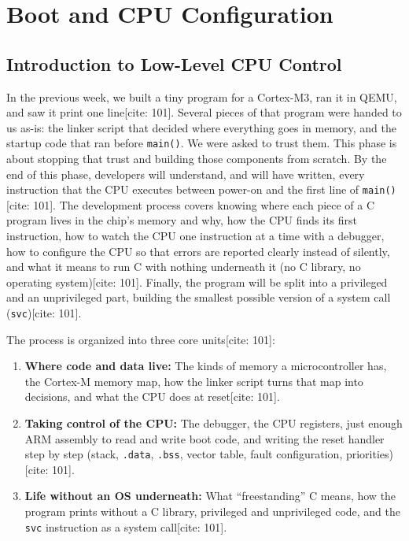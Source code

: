 \chapter{Boot and CPU Configuration}

\section{Introduction to Low-Level CPU Control}
In the previous week, we built a tiny program for a Cortex-M3, ran it in QEMU, and saw it print one line[cite: 101]. Several pieces of that program were handed to us as-is: the linker script that decided where everything goes in memory, and the startup code that ran before \texttt{main()}. We were asked to trust them. This phase is about stopping that trust and building those components from scratch.
By the end of this phase, developers will understand, and will have written, every instruction that the CPU executes between power-on and the first line of \texttt{main()}[cite: 101]. The development process covers knowing where each piece of a C program lives in the chip's memory and why, how the CPU finds its first instruction, how to watch the CPU one instruction at a time with a debugger, how to configure the CPU so that errors are reported clearly instead of silently, and what it means to run C with nothing underneath it (no C library, no operating system)[cite: 101]. Finally, the program will be split into a privileged and an unprivileged part, building the smallest possible version of a system call (\texttt{svc})[cite: 101].

The process is organized into three core units[cite: 101]:
\begin{enumerate}
    \item \textbf{Where code and data live:} The kinds of memory a microcontroller has, the Cortex-M memory map, how the linker script turns that map into decisions, and what the CPU does at reset[cite: 101].
    \item \textbf{Taking control of the CPU:} The debugger, the CPU registers, just enough ARM assembly to read and write boot code, and writing the reset handler step by step (stack, \texttt{.data}, \texttt{.bss}, vector table, fault configuration, priorities)[cite: 101].
    \item \textbf{Life without an OS underneath:} What ``freestanding'' C means, how the program prints without a C library, privileged and unprivileged code, and the \texttt{svc} instruction as a system call[cite: 101].
\end{enumerate}

